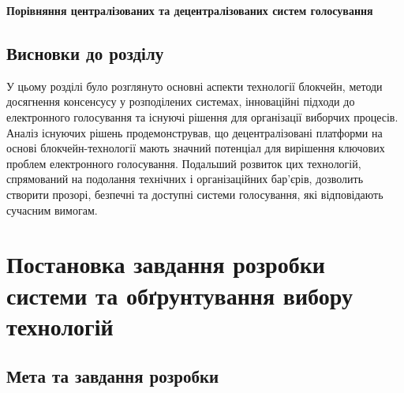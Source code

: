 \documentclass[14pt]{extreport}
\begin{document}
  \begin{table}[H]
  \centering
  \renewcommand{\tablename}{Таблиця}
  \renewcommand{\thetable}{\thechapter.\arabic{table}.}
  \caption{}
  \textbf{Порівняння централізованих та децентралізованих систем голосування\vspace{5pt}}
  \label{tab:voting_systems_comparison}
  \end{table}
  
  \section{Висновки до розділу}
  
  У цьому розділі було розглянуто основні аспекти технології блокчейн, методи досягнення консенсусу у розподілених системах, інноваційні підходи до електронного голосування та існуючі рішення для організації виборчих процесів. Аналіз існуючих рішень продемонстрував, що децентралізовані платформи на основі блокчейн-технології мають значний потенціал для вирішення ключових проблем електронного голосування. Подальший розвиток цих технологій, спрямований на подолання технічних і організаційних бар'єрів, дозволить створити прозорі, безпечні та доступні системи голосування, які відповідають сучасним вимогам.
  
  \chapter{Постановка завдання розробки системи та обґрунтування вибору технологій}

  \section{Мета та завдання розробки}
  
\end{document}
